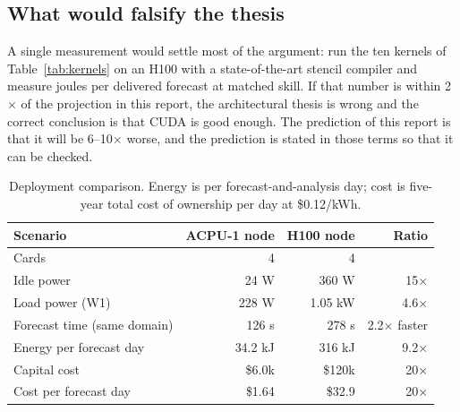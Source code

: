 \subsection{What would falsify the thesis}
A single measurement would settle most of the argument: run the ten kernels of Table~\ref{tab:kernels}
on an H100 with a state-of-the-art stencil compiler and measure joules per delivered forecast at
matched skill. If that number is within 2$\times$ of the projection in this report, the
architectural thesis is wrong and the correct conclusion is that CUDA is good enough. The
prediction of this report is that it will be 6--10$\times$ worse, and the prediction is stated in
those terms so that it can be checked.

\begin{table}[t]
\centering\small
\caption{Deployment comparison. Energy is per forecast-and-analysis day; cost is five-year total
cost of ownership per day at \$0.12/kWh.}
\label{tab:deploy}
\begin{tabular}{@{}lrrr@{}}
\toprule
Scenario & ACPU-1 node & H100 node & Ratio\\
\midrule
Cards & 4 & 4 & \\
Idle power & 24 W & 360 W & 15$\times$\\
Load power (W1) & 228 W & 1.05 kW & 4.6$\times$\\
Forecast time (same domain) & 126 s & 278 s & 2.2$\times$ faster\\
Energy per forecast day & 34.2 kJ & 316 kJ & 9.2$\times$\\
Capital cost & \$6.0k & \$120k & 20$\times$\\
Cost per forecast day & \$1.64 & \$32.9 & 20$\times$\\
\bottomrule
\end{tabular}
\end{table}
